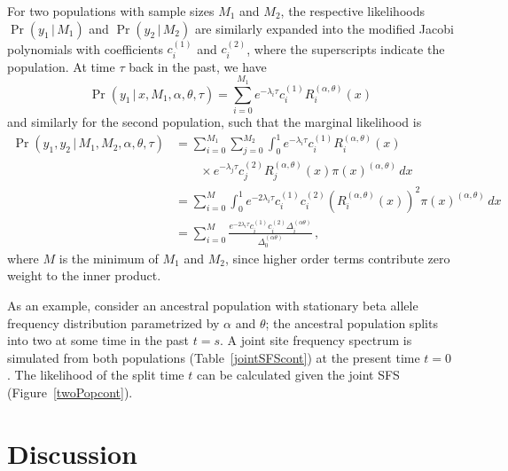 \documentclass[preprint]{elsarticle}
\newcommand\given{{\,|\,}}
\begin{document}
For two populations with sample sizes $M_1$ and $M_2$, the respective likelihoods $\Pr(y_1\given M_1)$ and $\Pr(y_2\given M_2)$ are similarly expanded into the modified Jacobi polynomials with coefficients $c_i^{(1)}$ and $c_i^{(2)}$, where the superscripts indicate the population. At time $\tau$ back in the past, we have
\begin{equation}
    \Pr(y_1\given x, M_1,\alpha,\theta,\tau)=
    \sum_{i=0}^{M_1} e^{-\lambda_i\tau}c_i^{(1)}R_i^{(\alpha,\theta)}(x)
\end{equation}
and similarly for the second population, such that the marginal likelihood is
\begin{equation}
\begin{split}
    \Pr(y_1,y_2\given M_1,M_2,\alpha,\theta,\tau)&=
    \sum_{i=0}^{M_1}\sum_{j=0}^{M_2}\int_0^1 e^{-\lambda_i\tau}c_i^{(1)}R_i^{(\alpha,\theta)}(x)\\
    &\qquad\times e^{-\lambda_j\tau}c_j^{(2)} R_j^{(\alpha,\theta)}(x)\pi(x)^{(\alpha,\theta)}  \,dx\\&=
    \sum_{i=0}^{M}\int_0^1 e^{-2\lambda_i\tau}c_i^{(1)}c_i^{(2)} (R_i^{(\alpha,\theta)}(x))^2\pi(x)^{(\alpha,\theta)}  \,dx\\
    &=\sum_{i=0}^{M}\frac{e^{-2\lambda_i\tau}c_i^{(1)} c_i^{(2)}\Delta_i^{(\alpha\theta)}}{\Delta_0^{(\alpha\theta)}}\,,
\end{split}
\end{equation}
where $M$ is the minimum of $M_1$ and $M_2$, since higher order terms contribute zero weight to the inner product. 

As an example, consider an ancestral population with stationary beta allele frequency distribution parametrized by $\alpha$ and $\theta$; the ancestral population splits into two at some time in the past $t=s$. A joint site frequency spectrum is simulated from both populations (Table~\ref{jointSFScont}) at the present time $t=0$. The likelihood of the split time $t$ can be calculated given the joint SFS (Figure~\ref{twoPopcont}). 

\section{Discussion}
\end{document}

